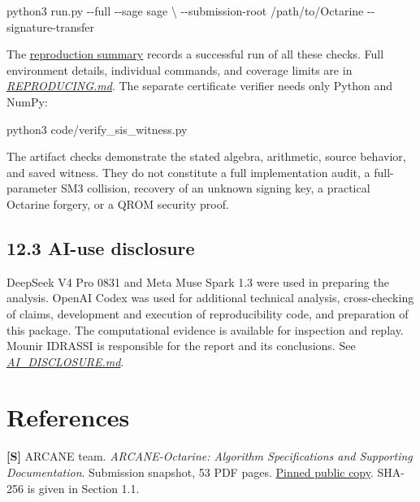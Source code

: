 \documentclass[
  american,
  10pt,
  a4paper,
]{article}
\newenvironment{Shaded}{}{}
\newcommand{\AttributeTok}[1]{\textcolor[rgb]{0.49,0.56,0.16}{#1}}
\newcommand{\DataTypeTok}[1]{\textcolor[rgb]{0.56,0.13,0.00}{#1}}
\newcommand{\ExtensionTok}[1]{#1}
\newcommand{\NormalTok}[1]{#1}
\begin{document}
\begin{Shaded}
\begin{Highlighting}[]
\ExtensionTok{python3}\NormalTok{ run.py }\AttributeTok{{-}{-}full} \AttributeTok{{-}{-}sage}\NormalTok{ sage }\DataTypeTok{\textbackslash{}}
  \AttributeTok{{-}{-}submission{-}root}\NormalTok{ /path/to/Octarine }\AttributeTok{{-}{-}signature{-}transfer}
\end{Highlighting}
\end{Shaded}

The \href{evidence/summary.json}{reproduction summary} records a
successful run of all these checks. Full environment details, individual
commands, and coverage limits are in
\href{REPRODUCING.md}{\emph{REPRODUCING.md}}. The separate certificate
verifier needs only Python and NumPy:

\begin{Shaded}
\begin{Highlighting}[]
\ExtensionTok{python3}\NormalTok{ code/verify\_sis\_witness.py}
\end{Highlighting}
\end{Shaded}

The artifact checks demonstrate the stated algebra, arithmetic, source
behavior, and saved witness. They do not constitute a full
implementation audit, a full-parameter SM3 collision, recovery of an
unknown signing key, a practical Octarine forgery, or a QROM security
proof.

\subsection{12.3 AI-use disclosure}\label{ai-use-disclosure}

DeepSeek V4 Pro 0831 and Meta Muse Spark 1.3 were used in preparing the
analysis. OpenAI Codex was used for additional technical analysis,
cross-checking of claims, development and execution of reproducibility
code, and preparation of this package. The computational evidence is
available for inspection and replay. Mounir IDRASSI is responsible for
the report and its conclusions. See
\href{AI_DISCLOSURE.md}{\emph{AI\_DISCLOSURE.md}}.

\section*{References}\label{references}

\textbf{{[}S{]}} ARCANE team. \emph{ARCANE-Octarine: Algorithm
Specifications and Supporting Documentation}. Submission snapshot, 53
PDF pages.
\href{https://github.com/ngcc-dev/ngcc-harness/blob/31de7d4d57aca530a65c2c9de6ddaeb25c66548d/sign-16/sign-16-spec.pdf}{Pinned
public copy}. SHA-256 is given in Section 1.1.
\end{document}
